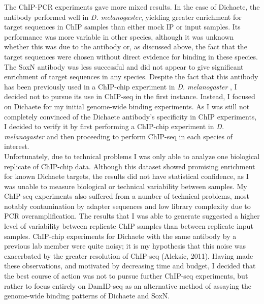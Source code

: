The ChIP-PCR experiments gave more mixed results. In the case of Dichaete, the antibody performed well in \emph{D. melanogaster}, yielding greater enrichment for target sequences in ChIP samples than either mock IP or input samples. Its performance was more variable in other species, although it was unknown whether this was due to the antibody or, as discussed above, the fact that the target sequences were chosen without direct evidence for binding in these species. The SoxN antibody was less successful and did not appear to give significant enrichment of target sequences in any species. Despite the fact that this antibody has been previously used in a ChIP-chip experiment in \emph{D. melanogaster} \citep{ferrero_soxneuro_2014}, I decided not to pursue its use in ChIP-seq in the first instance. Instead, I focused on Dichaete for my initial genome-wide binding experiments. As I was still not completely convinced of the Dichaete antibody’s specificity in ChIP experiments, I decided to verify it by first performing a ChIP-chip experiment in \emph{D. melanogaster} and then proceeding to perform ChIP-seq in each species of interest.\\
 
Unfortunately, due to technical problems I was only able to analyze one biological replicate of ChIP-chip data. Although this dataset showed promising enrichment for known Dichaete targets, the results did not have statistical confidence, as I was unable to measure biological or technical variability between samples. My ChIP-seq experiments also suffered from a number of technical problems, most notably contamination by adapter sequences and low library complexity due to PCR overamplification. The results that I was able to generate suggested a higher level of variability between replicate ChIP samples than between replicate input samples. ChIP-chip experiments for Dichaete with the same antibody by a previous lab member were quite noisy; it is my hypothesis that this noise was exacerbated by the greater resolution of ChIP-seq (Aleksic, 2011). Having made these observations, and motivated by decreasing time and budget, I decided that the best course of action was not to pursue further ChIP-seq experiments, but rather to focus entirely on DamID-seq as an alternative method of assaying the genome-wide binding patterns of Dichaete and SoxN.



